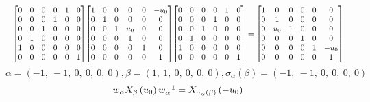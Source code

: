 \documentclass[11pt]{article}
\theoremstyle{definition}
\begin{document}
\[
\scaletoalign{\textwidth}{{\left[\begin{matrix}0 & 0 & 0 & 0 & 1 & 0\\0 & 0 & 0 & 1 & 0 & 0\\0 & 0 & 1 & 0 & 0 & 0\\0 & 1 & 0 & 0 & 0 & 0\\1 & 0 & 0 & 0 & 0 & 0\\0 & 0 & 0 & 0 & 0 & 1\end{matrix}\right]} {\left[\begin{matrix}1 & 0 & 0 & 0 & 0 & - u_{0}\\0 & 1 & 0 & 0 & 0 & 0\\0 & 0 & 1 & u_{0} & 0 & 0\\0 & 0 & 0 & 1 & 0 & 0\\0 & 0 & 0 & 0 & 1 & 0\\0 & 0 & 0 & 0 & 0 & 1\end{matrix}\right]} {\left[\begin{matrix}0 & 0 & 0 & 0 & 1 & 0\\0 & 0 & 0 & 1 & 0 & 0\\0 & 0 & 1 & 0 & 0 & 0\\0 & 1 & 0 & 0 & 0 & 0\\1 & 0 & 0 & 0 & 0 & 0\\0 & 0 & 0 & 0 & 0 & 1\end{matrix}\right]} = {\left[\begin{matrix}1 & 0 & 0 & 0 & 0 & 0\\0 & 1 & 0 & 0 & 0 & 0\\0 & u_{0} & 1 & 0 & 0 & 0\\0 & 0 & 0 & 1 & 0 & 0\\0 & 0 & 0 & 0 & 1 & - u_{0}\\0 & 0 & 0 & 0 & 0 & 1\end{matrix}\right]}}
\]
\[
\alpha = \left( -1, \  -1, \  0, \  0, \  0, \  0\right), \beta = \left( 1, \  1, \  0, \  0, \  0, \  0\right), \sigma_{\alpha}(\beta) = \left( -1, \  -1, \  0, \  0, \  0, \  0\right)
\]
\[
\scaletoalign{\textwidth}{w_{\alpha} X_{\beta}\left(u_{0}\right) w_{\alpha}^{-1} = X_{\sigma_{\alpha}\left(\beta\right)}\left(- u_{0}\right)}
\]
\end{document}
